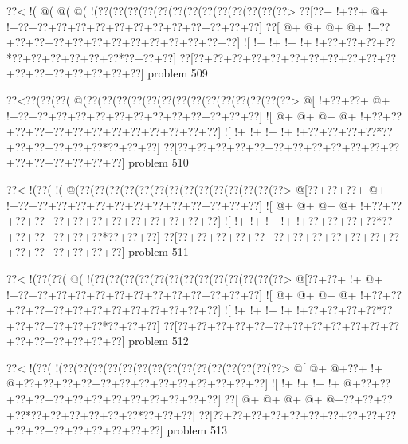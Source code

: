\vbox{\vbox{\goo
\0??<\- !(\- @(\- @(\- @(\- !(\0??(\0??(\0??(\0??(\0??(\0??(\0??(\0??(\0??(\0??(\0??(\0??(\0??>
\0??[\0??+\- !+\0??+\- @+\- !+\0??+\0??+\0??+\0??+\0??+\0??+\0??+\0??+\0??+\0??+\0??+\0??+\0??]
\0??[\- @+\- @+\- @+\- @+\- !+\0??+\0??+\0??+\0??+\0??+\0??+\0??+\0??+\0??+\0??+\0??+\0??+\0??]
\- ![\- !+\- !+\- !+\- !+\- !+\0??+\0??+\0??+\0??*\0??+\0??+\0??+\0??+\0??+\0??*\0??+\0??+\0??]
\0??[\0??+\0??+\0??+\0??+\0??+\0??+\0??+\0??+\0??+\0??+\0??+\0??+\0??+\0??+\0??+\0??+\0??+\0??]
}
\hfil problem 509\hfil\break
}



\vbox{\vbox{\goo
\0??<\0??(\0??(\0??(\- @(\0??(\0??(\0??(\0??(\0??(\0??(\0??(\0??(\0??(\0??(\0??(\0??(\0??(\0??>
\- @[\- !+\0??+\0??+\- @+\- !+\0??+\0??+\0??+\0??+\0??+\0??+\0??+\0??+\0??+\0??+\0??+\0??+\0??]
\- ![\- @+\- @+\- @+\- @+\- !+\0??+\0??+\0??+\0??+\0??+\0??+\0??+\0??+\0??+\0??+\0??+\0??+\0??]
\- ![\- !+\- !+\- !+\- !+\- !+\0??+\0??+\0??+\0??*\0??+\0??+\0??+\0??+\0??+\0??*\0??+\0??+\0??]
\0??[\0??+\0??+\0??+\0??+\0??+\0??+\0??+\0??+\0??+\0??+\0??+\0??+\0??+\0??+\0??+\0??+\0??+\0??]
}
\hfil problem 510\hfil\break
}



\vbox{\vbox{\goo
\0??<\- !(\0??(\- !(\- @(\0??(\0??(\0??(\0??(\0??(\0??(\0??(\0??(\0??(\0??(\0??(\0??(\0??(\0??>
\- @[\0??+\0??+\0??+\- @+\- !+\0??+\0??+\0??+\0??+\0??+\0??+\0??+\0??+\0??+\0??+\0??+\0??+\0??]
\- ![\- @+\- @+\- @+\- @+\- !+\0??+\0??+\0??+\0??+\0??+\0??+\0??+\0??+\0??+\0??+\0??+\0??+\0??]
\- ![\- !+\- !+\- !+\- !+\- !+\0??+\0??+\0??+\0??*\0??+\0??+\0??+\0??+\0??+\0??*\0??+\0??+\0??]
\0??[\0??+\0??+\0??+\0??+\0??+\0??+\0??+\0??+\0??+\0??+\0??+\0??+\0??+\0??+\0??+\0??+\0??+\0??]
}
\hfil problem 511\hfil\break
}



\vbox{\vbox{\goo
\0??<\- !(\0??(\0??(\- @(\- !(\0??(\0??(\0??(\0??(\0??(\0??(\0??(\0??(\0??(\0??(\0??(\0??(\0??>
\- @[\0??+\0??+\- !+\- @+\- !+\0??+\0??+\0??+\0??+\0??+\0??+\0??+\0??+\0??+\0??+\0??+\0??+\0??]
\- ![\- @+\- @+\- @+\- @+\- !+\0??+\0??+\0??+\0??+\0??+\0??+\0??+\0??+\0??+\0??+\0??+\0??+\0??]
\- ![\- !+\- !+\- !+\- !+\- !+\0??+\0??+\0??+\0??*\0??+\0??+\0??+\0??+\0??+\0??*\0??+\0??+\0??]
\0??[\0??+\0??+\0??+\0??+\0??+\0??+\0??+\0??+\0??+\0??+\0??+\0??+\0??+\0??+\0??+\0??+\0??+\0??]
}
\hfil problem 512\hfil\break
}



\vbox{\vbox{\goo
\0??<\- !(\0??(\- !(\0??(\0??(\0??(\0??(\0??(\0??(\0??(\0??(\0??(\0??(\0??(\0??(\0??(\0??(\0??>
\- @[\- @+\- @+\0??+\- !+\- @+\0??+\0??+\0??+\0??+\0??+\0??+\0??+\0??+\0??+\0??+\0??+\0??+\0??]
\- ![\- !+\- !+\- !+\- !+\- @+\0??+\0??+\0??+\0??+\0??+\0??+\0??+\0??+\0??+\0??+\0??+\0??+\0??]
\0??[\- @+\- @+\- @+\- @+\- @+\0??+\0??+\0??+\0??*\0??+\0??+\0??+\0??+\0??+\0??*\0??+\0??+\0??]
\0??[\0??+\0??+\0??+\0??+\0??+\0??+\0??+\0??+\0??+\0??+\0??+\0??+\0??+\0??+\0??+\0??+\0??+\0??]
}
\hfil problem 513\hfil\break
}



